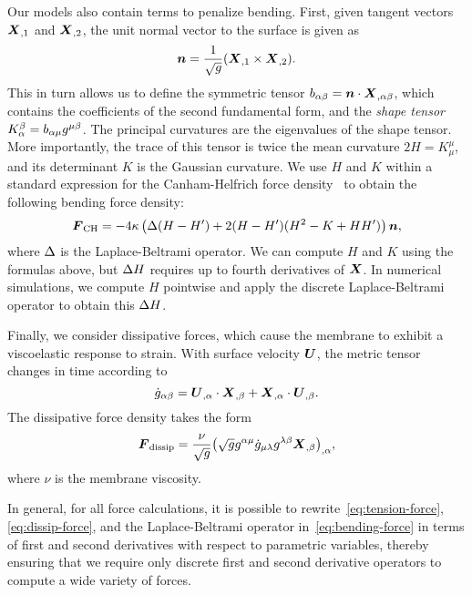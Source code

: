 Our models also contain terms to penalize bending. First, given tangent vectors $\boldsymbol{X}_{,1}$ and $\boldsymbol{X}_{,2}$, the unit
normal vector to the surface is given as
\begin{equation}\label{eq:unit-normal}
\boldsymbol{n} = \frac{1}{\sqrt{g}} (\boldsymbol{X}_{,1}\times\boldsymbol{X}_{,2}).
\end{equation}
This in turn allows us to define the symmetric tensor $b_{\alpha\beta} = \boldsymbol{n}\cdot\boldsymbol{X}_{,\alpha\beta}$, which contains
the coefficients of the second fundamental form, and the \emph{shape tensor}
$K_\alpha^\beta = b_{\alpha\mu}g^{\mu\beta}$. The principal curvatures are the eigenvalues of the shape
tensor. More importantly, the trace of this tensor is twice the mean curvature $2H = K_\mu^\mu$, and its
determinant $K$ is the Gaussian curvature. We use $H$ and $K$ within a standard expression for the Canham-Helfrich
force density~\cite{Zhongcan:1989ue} to obtain the following bending force density:
\begin{equation}\label{eq:bending-force}
    \boldsymbol{F}_\text{CH} = -4\kappa\left(\Delta(H-H')+2(H-H')(H^2-K+HH')\right)\boldsymbol{n},
\end{equation}
where $\Delta$ is the Laplace-Beltrami operator. We can compute $H$ and $K$ using the formulas above, but
$\Delta H$ requires up to fourth derivatives of $\boldsymbol{X}$. In numerical simulations, we compute $H$ pointwise and
apply the discrete Laplace-Beltrami operator to obtain this $\Delta H$.

Finally, we consider dissipative forces, which cause the membrane to exhibit a viscoelastic response to strain.
With surface velocity $\boldsymbol{U}$, the metric tensor changes in time according to
\begin{equation}
    \dot{g}_{\alpha\beta} = \boldsymbol{U}_{,\alpha}\cdot\boldsymbol{X}_{,\beta} + \boldsymbol{X}_{,\alpha}\cdot\boldsymbol{U}_{,\beta}.
\end{equation}
The dissipative force density takes the form~\cite{Rangamani:2012hi}
\begin{equation}\label{eq:dissip-force}
    \boldsymbol{F}_\text{dissip} = \frac{\nu}{\sqrt{g}}{\left(\sqrt{g}g^{\alpha\mu}\dot{g}_{\mu\lambda}g^{\lambda\beta}\boldsymbol{X}_{,\beta}\right)}_{,\alpha},
\end{equation}
where $\nu$ is the membrane viscosity.

In general, for all force calculations, it is possible to rewrite~\eqref{eq:tension-force},~%
\eqref{eq:dissip-force}, and the Laplace-Beltrami operator in~\eqref{eq:bending-force} in terms of first and
second derivatives with respect to parametric variables, thereby ensuring that we require only discrete first and
second derivative operators to compute a wide variety of forces.
